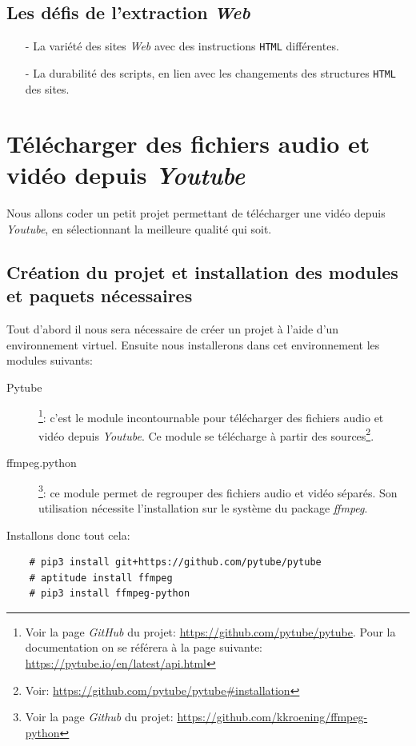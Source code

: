 \documentclass[a4paper,12pt]{book}
\begin{document}
\section{Les défis de l'extraction \textit{Web}}
\begin{itemize}
	\item[-] La variété des sites \textit{Web} avec des instructions \texttt{HTML} différentes.
	\item[-] La durabilité des scripts, en lien avec les changements des structures \texttt{HTML} des sites.
\end{itemize}
\medskip

\chapter{Télécharger des fichiers audio et vidéo depuis \textit{Youtube}}
Nous allons coder un petit projet permettant de télécharger une vidéo depuis \textit{Youtube}, en sélectionnant la meilleure qualité qui  soit.
\medskip

\section{Création du projet et installation des modules et paquets nécessaires}
Tout d'abord il nous sera nécessaire de créer un projet à l'aide d'un environnement virtuel. Ensuite nous installerons dans cet environnement les modules suivants:
\begin{description}
	\item[Pytube]\footnote{Voir la page \textit{GitHub} du projet: \url{https://github.com/pytube/pytube}. Pour la documentation on se référera à la page suivante: \url{https://pytube.io/en/latest/api.html}}: c'est le module incontournable pour télécharger des fichiers audio et vidéo depuis \textit{Youtube}. Ce module se télécharge à partir des sources\footnote{Voir: \url{https://github.com/pytube/pytube\#installation}}.
	\item[ffmpeg.python]\footnote{Voir la page \textit{Github} du projet: \url{https://github.com/kkroening/ffmpeg-python}}: ce module permet de regrouper des fichiers audio et vidéo séparés. Son utilisation nécessite l'installation sur le système du package \textit{ffmpeg}.
\end{description}
\medskip

Installons donc tout cela:
\begin{verbatim}
    # pip3 install git+https://github.com/pytube/pytube
    # aptitude install ffmpeg
    # pip3 install ffmpeg-python
\end{verbatim}
\medskip
\end{document}
